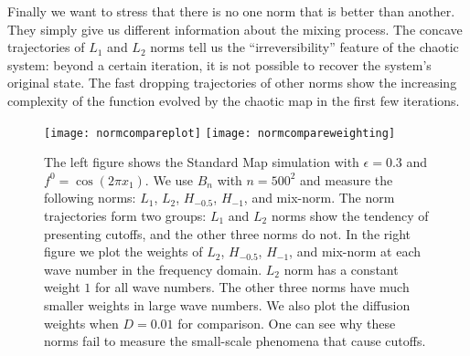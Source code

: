 Finally we want to stress that there is no one norm that is better than another. They simply give us different information about the mixing process. The concave trajectories of $L_1$ and $L_2$ norms tell us the ``irreversibility'' feature of the chaotic system: beyond a certain iteration, it is not possible to recover the system's original state. The fast dropping trajectories of other norms show the increasing complexity of the function evolved by the chaotic map in the first few iterations.  



\begin{figure}
    \centerline{
      \texttt{[image: normcompareplot]}
      \texttt{[image: normcompareweighting]}
    }
    \caption{\label{normcompare} The left figure shows the Standard Map simulation with $\epsilon=0.3$ and $f^0= \cos(2\pi x_1)$. We use $B_n$ with $n=500^2$ and measure the following norms: $L_1$, $L_2$, $H_{-0.5}$, $H_{-1}$, and mix-norm. The norm trajectories form two groups: $L_1$ and $L_2$ norms show the tendency of presenting cutoffs, and the other three norms do not. In the right figure we plot the weights of $L_2$, $H_{-0.5}$, $H_{-1}$, and mix-norm at each wave number in the frequency domain. $L_2$ norm has a constant weight $1$ for all wave numbers. The other three norms have much smaller weights in large wave numbers. We also plot the diffusion weights when $D=0.01$ for comparison. One can see why these norms fail to measure the small-scale phenomena that cause cutoffs.}

\end{figure}



